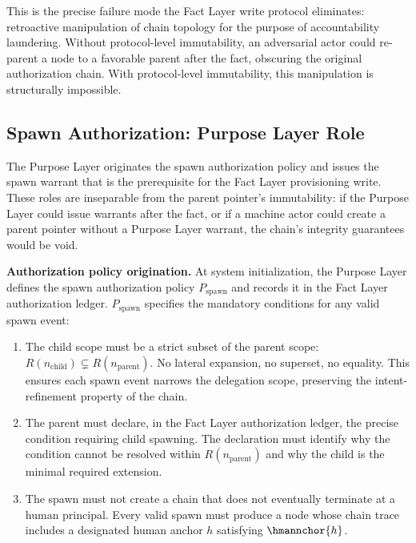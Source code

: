 This is the precise failure mode the Fact Layer write protocol eliminates: retroactive manipulation of chain topology for the purpose of accountability laundering. Without protocol-level immutability, an adversarial actor could re-parent a node to a favorable parent after the fact, obscuring the original authorization chain. With protocol-level immutability, this manipulation is structurally impossible.

\subsection{Spawn Authorization: Purpose Layer Role}
\label{sec:purpose-layer-spawn-authorization}

The Purpose Layer originates the spawn authorization policy and issues the spawn warrant that is the prerequisite for the Fact Layer provisioning write. These roles are inseparable from the parent pointer's immutability: if the Purpose Layer could issue warrants after the fact, or if a machine actor could create a parent pointer without a Purpose Layer warrant, the chain's integrity guarantees would be void.

\medskip
\noindent\textbf{Authorization policy origination.} At system initialization, the Purpose Layer defines the spawn authorization policy $P_{\mathrm{spawn}}$ and records it in the Fact Layer authorization ledger. $P_{\mathrm{spawn}}$ specifies the mandatory conditions for any valid spawn event:

\begin{enumerate}
    \item[(S1) \textbf{Scope refinement.}] The child scope must be a strict subset of the parent scope: $R(n_{\mathrm{child}}) \subsetneq R(n_{\mathrm{parent}})$. No lateral expansion, no superset, no equality. This ensures each spawn event narrows the delegation scope, preserving the intent-refinement property of the chain.

    \item[(S2) \textbf{Operational necessity.}] The parent must declare, in the Fact Layer authorization ledger, the precise condition requiring child spawning. The declaration must identify why the condition cannot be resolved within $R(n_{\mathrm{parent}})$ and why the child is the minimal required extension.

    \item[(S3) \textbf{Human-terminating chain.}] The spawn must not create a chain that does not eventually terminate at a human principal. Every valid spawn must produce a node whose chain trace includes a designated human anchor $h$ satisfying $\hmannchor{h}$.
\end{enumerate}

